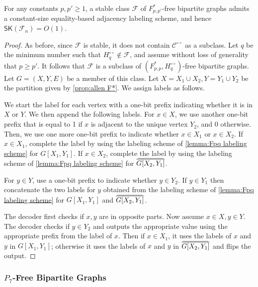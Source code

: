 \documentclass{theoretics}
\newcommand{\cC}{\ensuremath{\mathcal{C}}}
\newcommand{\cF}{\ensuremath{\mathcal{F}}}
\newcommand\doverline[1]{%
  \setbox0=\hbox{$\!\overline{#1}\!$}%
  \ht0=\dimexpr\ht0-.2ex\relax%
  \,\overline{\copy0}\,%
}
\newcommand{\bc}[1]{\doverline{#1}} %
\newcommand{\RL}{\mathsf{SK}}
\newcommand{\dcirc}{{\circ\circ}}
\begin{document}
\begin{theorem}
\label{th:Fpq labeling}
For any constants $p,p' \geq 1$, a stable class $\cF$ of $F^*_{p,p'}$-free bipartite graphs 
admits a constant-size equality-based adjacency labeling scheme, and hence $\RL(\cF_n) = O(1)$.
\end{theorem}
\begin{proof}
	As before, since $\cF$ is stable, it does not contain $\cC^\dcirc$ as a subclass.
	Let $q$ be the minimum number such that $H^{\circ\circ}_q \not\in \cF$, and 
	assume without loss of generality that $p \geq p'$.
	It follows that $\cF$ is a subclass of $(F^*_{p,p}, H^{\circ\circ}_q)$-free bipartite
	graphs. Let $G = (X,Y,E)$ be a member of this class. Let $X=X_1\cup X_2, Y = Y_1 \cup Y_2$ be the partition given by \cref{prop:allen F*}. We assign labels as follows.

We start the label for each vertex with a one-bit prefix indicating whether it is in $X$ or $Y$. We
then append the following labels. For $x \in X$, we use another one-bit prefix that is equal to 1 if $x$ is adjacent to the unique vertex $Y_2$, and 0 otherwise. Then, we use one more one-bit prefix to indicate whether $x \in X_1$ or $x \in X_2$. If $x \in X_1$, complete the label by using the labeling scheme of \cref{lemma:Fpq labeling scheme} for $G[X_1,Y_1]$. If $x \in X_2$, complete the label by using the labeling scheme of \cref{lemma:Fpq labeling scheme} for $\bc{G[X_2,Y_1]}$.

For $y \in Y$, use a one-bit prefix to indicate whether $y \in Y_2$. If $y \in Y_1$ then concatenate the two labels for $y$ obtained from the labeling scheme of \cref{lemma:Fpq labeling scheme} for
$G[X_1,Y_1]$ and $\bc{G[X_2,Y_1]}$.

The decoder first checks if $x,y$ are in opposite parts. Now assume $x \in X, y \in Y$. The decoder
checks if $y \in Y_2$ and outputs the appropriate value using the appropriate prefix from the label of
$x$. Then if $x \in X_1$, it uses the labels of $x$ and $y$ in $G[X_1,Y_1]$; otherwise it uses the
labels of $x$ and $y$ in $\bc{G[X_2,Y_1]}$ and flips the output.
\end{proof}





\subsubsection{\texorpdfstring{$P_7$}{P7}-Free Bipartite Graphs}
\label{subsection:P7}
\end{document}
